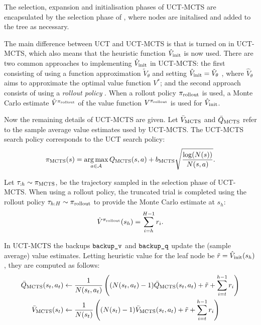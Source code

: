         The selection, expansion and initialisation phases of UCT-MCTS are encapsulated by the selection phase of \thtspp, where nodes are initalised and added to the tree as necessary.

        The main difference between UCT and UCT-MCTS is that \mctsmode\ewe is turned on in UCT-MCTS, which also means that the heuristic function ${\hat{V}_{\textnormal{init}}}$ is now used. There are two common approaches to implementing ${\hat{V}_{\textnormal{init}}}$ in UCT-MCTS: the first consisting of using a function approximation $\tilde{V}_\theta$ and setting ${\hat{V}_{\textnormal{init}}}=\tilde{V}_\theta$ , where $\hat{V}_\theta$ aims to approximate the optimal value function $V^*$; and the second approach consists of using a \textit{rollout policy} . When a rollout policy ${\pi_{{\textnormal{rollout}}}}$ is used, a Monte Carlo estimate $\hat{V}^{{\pi_{{\textnormal{rollout}}}}}$ of the value function $V^{{\pi_{{\textnormal{rollout}}}}}$ is used for ${\hat{V}_{\textnormal{init}}}$.
        
        Now the remaining details of UCT-MCTS are given. Let ${\bar{V}_{{\textnormal{MCTS}}}}$ and ${\bar{Q}_{{\textnormal{MCTS}}}}$ refer to the sample average value estimates used by UCT-MCTS. The UCT-MCTS search policy corresponds to the UCT search policy:
        \begin{align}
            \pi_{{\textnormal{MCTS}}}(s) = \operatorname*{arg\,max}_{a\in\mathcal{A}} Q_{{\textnormal{MCTS}}}(s,a) + b_{{\textnormal{MCTS}}} \sqrt{\frac{\log(N(s))}{N(s,a)}}.
        \end{align}

        Let $\tau_{:h}\sim{\pi_{{\textnormal{MCTS}}}}$, be the trajectory sampled in the selection phase of UCT-MCTS. When using a rollout policy, the truncated trial is completed using the rollout policy $\tau_{h:H}\sim{\pi_{{\textnormal{rollout}}}}$ to provide the Monte Carlo estimate at $s_h$:
        \begin{align}
            \hat{V}^{{\pi_{{\textnormal{rollout}}}}}(s_h) = \sum_{i=h}^{H-1} r_i.
        \end{align}

        In UCT-MCTS the backups ${\textnormal{\texttt{backup\_v}}}$ and ${\textnormal{\texttt{backup\_q}}}$ update the (sample average) value estimates. Letting heuristic value for the leaf node be $\tilde{r} = {\hat{V}_{\textnormal{init}}}(s_h)$, they are computed as follows:
        \begin{align}
            \bar{Q}_{{\textnormal{MCTS}}}(s_t,a_t) &\leftarrow 
                \frac{1}{N(s_t,a_t)} \left( (N(s_t,a_t)-1) \bar{Q}_{{\textnormal{MCTS}}}(s_t,a_t) 
                    + \tilde{r} + \sum_{i=t}^{h-1} r_i \right) \\
            \bar{V}_{{\textnormal{MCTS}}}(s_t) &\leftarrow 
                \frac{1}{N(s_t)} \left( (N(s_t)-1) \bar{V}_{{\textnormal{MCTS}}}(s_t,a_t) 
                    + \tilde{r} + \sum_{i=t}^{h-1} r_i \right) 
        \end{align}  


